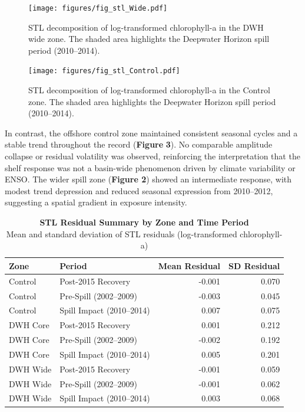 \documentclass[
  11pt,
]{article}
\begin{document}
\begin{figure}[H]

{\centering \texttt{[image: figures/fig\_stl\_Wide.pdf]}

}

\caption{STL decomposition of log-transformed chlorophyll-a in the DWH
wide zone. The shaded area highlights the Deepwater Horizon spill period
(2010--2014).}

\end{figure}%

\begin{figure}[H]

{\centering \texttt{[image: figures/fig\_stl\_Control.pdf]}

}

\caption{STL decomposition of log-transformed chlorophyll-a in the
Control zone. The shaded area highlights the Deepwater Horizon spill
period (2010--2014).}

\end{figure}%

In contrast, the offshore control zone maintained consistent seasonal
cycles and a stable trend throughout the record (\textbf{Figure}
\textbf{3}). No comparable amplitude collapse or residual volatility was
observed, reinforcing the interpretation that the shelf response was not
a basin-wide phenomenon driven by climate variability or ENSO. The wider
spill zone (\textbf{Figure 2}) showed an intermediate response, with
modest trend depression and reduced seasonal expression from 2010--2012,
suggesting a spatial gradient in exposure intensity.

\begin{table}
\caption*{
{\large \textbf{STL Residual Summary by Zone and Time Period}} \\ 
{\small Mean and standard deviation of STL residuals (log-transformed chlorophyll-a)}
} 
\fontsize{9.0pt}{10.8pt}\selectfont
\begin{tabular*}{\linewidth}{@{\extracolsep{\fill}}llrr}
\toprule
Zone & Period & Mean Residual & SD Residual \\ 
\midrule\addlinespace[2.5pt]
Control & Post-2015 Recovery & -0.001 & 0.070 \\ 
Control & Pre-Spill (2002–2009) & -0.003 & 0.045 \\ 
Control & Spill Impact (2010–2014) & 0.007 & 0.075 \\ 
DWH Core & Post-2015 Recovery & 0.001 & 0.212 \\ 
DWH Core & Pre-Spill (2002–2009) & -0.002 & 0.192 \\ 
DWH Core & Spill Impact (2010–2014) & 0.005 & 0.201 \\ 
DWH Wide & Post-2015 Recovery & -0.001 & 0.059 \\ 
DWH Wide & Pre-Spill (2002–2009) & -0.001 & 0.062 \\ 
DWH Wide & Spill Impact (2010–2014) & 0.003 & 0.068 \\ 
\bottomrule
\end{tabular*}
\end{table}
\end{document}
